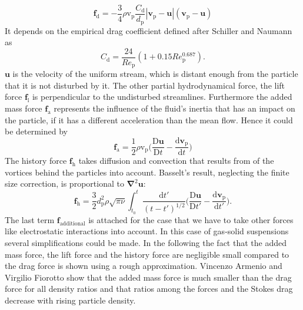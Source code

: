 \documentclass[11pt,a4paper,openany,oneside,parskip=half*]{article}
\renewcommand*\vec[1]{\boldsymbol{#1}}
\begin{document}
\begin{equation}
\vec{f}_\mathrm{d}=-\frac{3}{4}\rho \mathrm{v}_\mathrm{p} \frac{C_\mathrm{d}}{d_\mathrm{p}}|\vec{v}_\mathrm{p}-\vec{u}|(\vec{v}_\mathrm{p}-\vec{u})
\end{equation}
It depends on the empirical drag coefficient defined after Schiller and Naumann as
\begin{equation} \label{C_d}
C_\mathrm{d} = \frac{24}{Re_\mathrm{p}}(1+0.15Re_\mathrm{p}^\mathrm{0.687}).
\end{equation}
$\vec{u}$ is the velocity of the uniform stream, which is distant enough from the particle that it is not disturbed by it.
The other partial hydrodynamical force, the lift force $\vec{f}_\mathrm{l}$ is perpendicular to the undisturbed streamlines.
Furthermore the added mass force $\vec{f}_\mathrm{a}$ represents the influence of the fluid's inertia that has an impact on the particle, if it has a different acceleration than the mean flow.
Hence it could be determined by
\begin{equation}
\vec{f}_\mathrm{a} =  \frac{1}{2}\rho \mathrm{v}_\mathrm{p} \biggl(\frac{\mathrm{D}\vec{u}}{\mathrm{D}t}-\frac{\mathrm{d}\vec{v}_\mathrm{p}}{\mathrm{d}t}\biggl)
\end{equation}
The history force $\vec{f}_\mathrm{h}$ takes diffusion and convection that results from of the vortices behind the particles into account. Basselt's result, neglecting the finite size correction, is proportional to $\vec\nabla^\mathrm{2}\vec{u}$:
\begin{equation}
\vec{f}_\mathrm{h} = \frac{3}{2}d_\mathrm{p}^\mathrm{2}\rho\sqrt{\pi\nu}\int_{t_\mathrm{0}}^{t} \frac{\mathrm{d}t'}{(t-t')^\mathrm{1/2}} \biggl(\frac{\mathrm{D}\vec{u}}{\mathrm{D}t'}- \frac{\mathrm{d}\vec{v}_\mathrm{p}}{\mathrm{d}t'}\biggl).  
\end{equation}
The last term $\vec{f}_\mathrm{additional}$ is attached for the case that we have to take other forces like electrostatic interactions into account.
In this case of gas-solid suspensions several simplifications could be made.
\newline
In the following the fact that the added mass force, the lift force and the history force are negligible small compared to the drag force is shown using a rough approximation.
Vincenzo Armenio and Virgilio Fiorotto \cite{TheImportanceOfTheForcesActingOnParticlesInTurbulentFlows} show that the added mass force is much smaller than the drag force for all density ratios and that ratios among the forces and the Stokes drag decrease with rising particle density.
\end{document}
